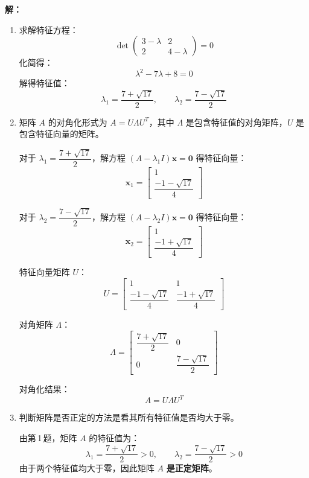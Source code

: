 \documentclass[12pt,a4paper]{article}
\begin{document}
\textbf{解：}
\begin{enumerate}

\item 求解特征方程：
\[
\det\begin{pmatrix} 3-\lambda & 2 \\ 2 & 4-\lambda \end{pmatrix} = 0
\]
化简得：
\[
\lambda^2 - 7\lambda + 8 = 0
\]
解得特征值：
\[
\lambda_1 = \frac{7+\sqrt{17}}{2}, \qquad \lambda_2 = \frac{7-\sqrt{17}}{2}
\]

\item 矩阵 $A$ 的对角化形式为 $A = U\Lambda U^T$，其中 $\Lambda$ 是包含特征值的对角矩阵，$U$ 是包含特征向量的矩阵。

对于 $\lambda_1 = \dfrac{7+\sqrt{17}}{2}$，解方程 $(A-\lambda_1 I)\mathbf{x}=\mathbf{0}$ 得特征向量：
\[
\mathbf{x}_1 = \begin{bmatrix} 1 \\[4pt] \dfrac{-1-\sqrt{17}}{4} \end{bmatrix}
\]

对于 $\lambda_2 = \dfrac{7-\sqrt{17}}{2}$，解方程 $(A-\lambda_2 I)\mathbf{x}=\mathbf{0}$ 得特征向量：
\[
\mathbf{x}_2 = \begin{bmatrix} 1 \\[4pt] \dfrac{-1+\sqrt{17}}{4} \end{bmatrix}
\]

特征向量矩阵 $U$：
\[
U = \begin{bmatrix}
1 & 1 \\[6pt]
\dfrac{-1-\sqrt{17}}{4} & \dfrac{-1+\sqrt{17}}{4}
\end{bmatrix}
\]

对角矩阵 $\Lambda$：
\[
\Lambda = \begin{bmatrix}
\dfrac{7+\sqrt{17}}{2} & 0 \\[6pt]
0 & \dfrac{7-\sqrt{17}}{2}
\end{bmatrix}
\]

对角化结果：
\[
A = U\Lambda U^T
\]

\item 判断矩阵是否正定的方法是看其所有特征值是否均大于零。

由第\,1\,题，矩阵 $A$ 的特征值为：
\[
\lambda_1 = \frac{7+\sqrt{17}}{2} > 0, \qquad \lambda_2 = \frac{7-\sqrt{17}}{2} > 0
\]
由于两个特征值均大于零，因此矩阵 $A$ \textbf{是正定矩阵}。

\end{enumerate}

	
\end{document}
